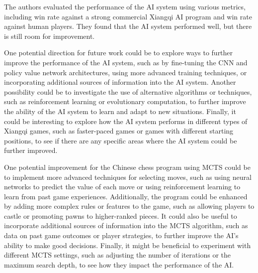 \documentclass[10pt,twocolumn]{article}
\begin{document}
    The authors evaluated the performance of the AI system using various metrics, including win rate against a strong commercial Xiangqi AI program and win rate against human players. They found that the AI system performed well, but there is still room for improvement.

    One potential direction for future work could be to explore ways to further improve the performance of the AI system, such as by fine-tuning the CNN and policy value network architectures, using more advanced training techniques, or incorporating additional sources of information into the AI system. Another possibility could be to investigate the use of alternative algorithms or techniques, such as reinforcement learning or evolutionary computation, to further improve the ability of the AI system to learn and adapt to new situations. Finally, it could be interesting to explore how the AI system performs in different types of Xiangqi games, such as faster-paced games or games with different starting positions, to see if there are any specific areas where the AI system could be further improved.

    One potential improvement for the Chinese chess program using MCTS could be to implement more advanced techniques for selecting moves, such as using neural networks to predict the value of each move or using reinforcement learning to learn from past game experiences. Additionally, the program could be enhanced by adding more complex rules or features to the game, such as allowing players to castle or promoting pawns to higher-ranked pieces. It could also be useful to incorporate additional sources of information into the MCTS algorithm, such as data on past game outcomes or player strategies, to further improve the AI's ability to make good decisions. Finally, it might be beneficial to experiment with different MCTS settings, such as adjusting the number of iterations or the maximum search depth, to see how they impact the performance of the AI.





\printbibliography 
\end{document}

